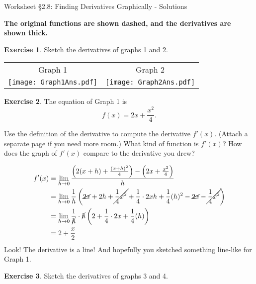 \documentclass[11pt,fleqn]{article}
\theoremstyle{definition}
\newtheorem{exercise}{Exercise}
\begin{document}
\renewcommand{\headrulewidth}{0pt}



\begin{Large} 
\begin{center}{\sc
Worksheet \S2.8: Finding Derivatives Graphically - Solutions }\end{center} \end{Large}

{\bf The original functions are shown dashed, and the derivatives are shown thick.}

\bigskip
\begin{exercise} Sketch the derivatives of graphs 1 and 2.\end{exercise}
\begin{tabular}{c  c}
Graph 1 & Graph 2 \\
\texttt{[image: Graph1Ans.pdf]} &\texttt{[image: Graph2Ans.pdf]}\\
\end{tabular}
\vfill


\begin{exercise}
The equation of Graph 1 is 
\[f(x) = 2 x + \frac{x^2}{4}.\]

Use the definition of the derivative to compute the derivative $f'(x)$. (Attach a separate page if you need more room.) What kind of function is $f'(x)$? How does the graph of $f'(x)$ compare to the derivative you drew?
\end{exercise}

\begin{align*}
f'(x) &= \lim_{h \to 0} \frac{\left( 2(x + h) + \frac{ (x +h)^{2}}{4} \right)  - \left(2 x + \frac{x^2}{4}\right)}{h} \\
%
&= \lim_{h \to 0} \frac{1}{h} \left(\cancel{2x} + 2h + \cancel{\frac{1}{4} x^{2} }+  \frac{1}{4}\cdot 2 x h +  \frac{1}{4}(h)^{2}  -\cancel{2x}  - \cancel{\frac{1}{4} x^{2}}\right)\\
%
&= \lim_{h \to 0} \frac{1}{\cancel{h}} \cdot \cancel{h} \left( 2+  \frac{1}{4}\cdot 2 x +  \frac{1}{4}(h)  \right)\\
&= 2+ \frac{x}{2}
\end{align*}
 Look! The derivative is a line! And hopefully you sketched something line-like for Graph 1.
\vfill
\newpage
\begin{exercise} Sketch the derivatives of graphs 3 and 4.\end{exercise}
\end{document}
